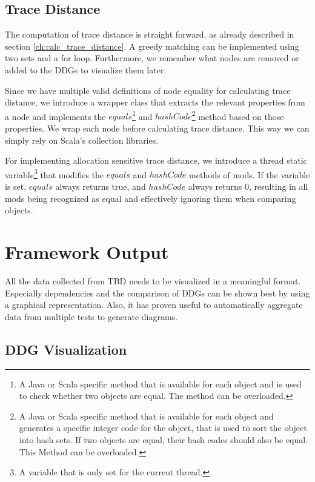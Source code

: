 \subsection{Trace Distance}

The computation of trace distance is straight forward, as already described in section \ref{ch:calc_trace_distance}. A greedy matching can be implemented using two sets and a for loop. Furthermore, we remember what nodes are removed or added to the DDGs to visualize them later.

Since we have multiple valid definitions of node equality for calculating trace distance, we introduce a wrapper class that extracts the relevant properties from a node and implements the $equals$\footnote{A Java or Scala specific method that is available for each object and is used to check whether two objects are equal. The method can be overloaded.} and $hashCode$\footnote{A Java or Scala specific method that is available for each object and generates a specific integer code for the object, that is used to sort the object into hash sets. If two objects are equal, their hash codes should also be equal. This Method can be overloaded.} method based on those properties. We wrap each node before calculating trace distance. This way we can simply rely on Scala's collection libraries.

For implementing allocation sensitive trace distance, we introduce a thread static variable\footnote{A variable that is only set for the current thread.} that modifies the $equals$ and $hashCode$ methods of mods. If the variable is set, $equals$ always returns true, and $hashCode$ always returns $0$, resulting in all mods being recognized as equal and effectively ignoring them when comparing objects. 

\section{Framework Output}

All the data collected from TBD needs to be visualized in a meaningful format. Especially dependencies and the comparison of DDGs can be shown best by using a graphical representation. Also, it has proven useful to automatically aggregate data from multiple tests to generate diagrams. 

\subsection{DDG Visualization}

